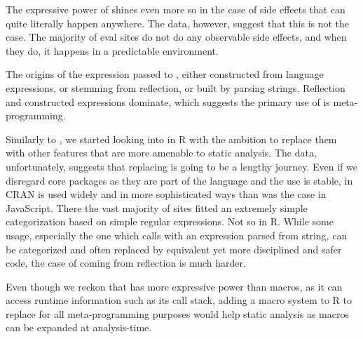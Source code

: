 \documentclass[review,screen,acmsmall,anonymous=true]{acmart}
\begin{document}
The expressive power of \eval shines even more so in the case of side effects
that can quite literally happen anywhere. The data, however, suggest that this
is not the case. The majority of eval sites do not do any observable side
effects, and when they do, it happens in a predictable environment.

The origins of the expression passed to \eval, either constructed from language
expressions, or stemming from reflection, or built by parsing strings.
Reflection and constructed expressions dominate, which suggests the primary use
of \eval is meta-programming.

Similarly to \citep{ecoop11}, we started looking into \evals in R with the
ambition to replace them with other features that are more amenable to static
analysis. The data, unfortunately, suggests that replacing \eval is going to be
a lengthy journey. Even if we disregard core packages as they are part of the
language and the \eval use is stable, in CRAN \eval is used widely and in more
sophisticated ways than was the case in JavaScript. There the vast majority of
sites fitted an extremely simple categorization based on simple regular
expressions. Not so in R. While some usage, especially the one which calls \eval
with an expression parsed from string, can be categorized and often replaced by
equivalent yet more disciplined and safer code, the case of \eval coming from
reflection is much harder.

Even though we reckon that \eval has more expressive power than macros, as it
can access runtime information such as its call stack, adding a macro system to
R to replace \eval for all meta-programming purposes would help static analysis
as macros can be expanded at analysis-time.



\end{document}
